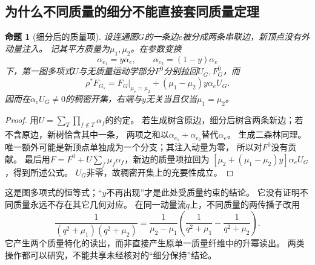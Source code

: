 \documentclass[11pt,a4paper]{ctexart}
\theoremstyle{cnplain}\newtheorem{theorem}{定理}[section]
\newtheorem{proposition}[theorem]{命题}
\theoremstyle{definition}\newtheorem{definition}[theorem]{定义}
\theoremstyle{remark}\newtheorem{remark}[theorem]{注}
\begin{document}
\subsection{为什么不同质量的细分不能直接套同质量定理}
\begin{proposition}[细分后的质量项]\label{prop:splitmassidentity}
设连通图$G$的一条边$e$被分成两条串联边，新顶点没有外动量注入。
记其平方质量为$\mu_1,\mu_2$。在参数变换
\[
 \alpha_{e_1}=y\alpha_e,\qquad
 \alpha_{e_2}=(1-y)\alpha_e
\]
下，第一图多项式$U$与无质量运动学部分$F^0$分别拉回$U_G,F_G^0$，而
\begin{equation}\label{eq:splitmassidentity}
 \rho^*F_{G_s}
 =F_G\big|_{\mu_e=\mu_2}
   +(\mu_1-\mu_2)y\alpha_eU_G.
\end{equation}
因而在$\alpha_eU_G\ne0$的稠密开集，右端与$y$无关当且仅当$\mu_1=\mu_2$。
\end{proposition}
\begin{proof}
用$U=\sum_T\prod_{f\notin T}\alpha_f$的约定。
若生成树含原边，细分后树含两条新边；若不含原边，新树恰含其中一条，
两项之和以$\alpha_{e_1}+\alpha_{e_2}$替代$\alpha_e$。
生成二森林同理。唯一额外可能是新顶点单独成为一个分支；其注入动量为零，
所以对$F^0$没有贡献。
最后用$F=F^0+U\sum_f\mu_f\alpha_f$，新边的质量项拉回为
$[\mu_2+(\mu_1-\mu_2)y]\alpha_eU_G$，得到所述公式。
$U_G$非零，故稠密开集上的充要性成立。
\end{proof}

这是图多项式的恒等式；“$y$不再出现”才是此处受质量约束的结论。
它没有证明不同质量永远不存在其它几何对应。
在同一动量流$q$上，不同质量的两传播子改用
\[
 \frac1{(q^2+\mu_1)(q^2+\mu_2)}
 =\frac1{\mu_2-\mu_1}
   \left(\frac1{q^2+\mu_1}-\frac1{q^2+\mu_2}\right).
\]
它产生两个质量特化的读出，而非直接产生原单一质量纤维中的升幂读出。
两类操作都可以研究，不能共享未经核对的“细分保持”结论。
\end{document}
